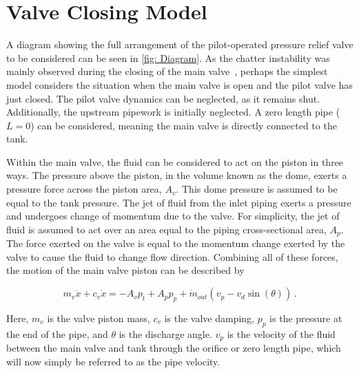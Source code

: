 \chapter{Valve Closing Model} \label{sec: Prog}

A diagram showing the full arrangement of the pilot-operated pressure relief valve to be considered can be seen in \cref{fig: Diagram}. As the chatter instability was mainly observed during the closing of the main valve~\cite{Allison2015TestingValves}, perhaps the simplest model considers the situation when the main valve is open and the pilot valve has just closed. The pilot valve dynamics can be neglected, as it remains shut. Additionally, the upstream pipework is initially neglected. A zero length pipe ($L=0$) can be considered, meaning the main valve is directly connected to the tank. 



Within the main valve, the fluid can be considered to act on the piston in three ways. The pressure above the piston, in the volume known as the dome, exerts a pressure force across the piston area, $A_v$. This dome pressure is assumed to be equal to the tank pressure. The jet of fluid from the inlet piping exerts a pressure and undergoes change of momentum due to the valve. For simplicity, the jet of fluid is assumed to act over an area equal to the piping cross-sectional area, $A_p$. The force exerted on the valve is equal to the momentum change exerted by the valve to cause the fluid to change flow direction. Combining all of these forces, the motion of the main valve piston can be described by

\begin{equation} \label{eq: Newton}
    m_v \ddot{x} + c_v \dot{x} = - A_v p_t + A_p p_p + \dot{m}_{out} \left( v_p - v_d \sin(\theta) \right) \, .
\end{equation}

Here, $m_v$ is the valve piston mass, $c_v$ is the valve damping, $p_p$ is the pressure at the end of the pipe, and $\theta$ is the discharge angle. $v_p$ is the velocity of the fluid between the main valve and tank through the orifice or zero length pipe, which will now simply be referred to as the pipe velocity.


